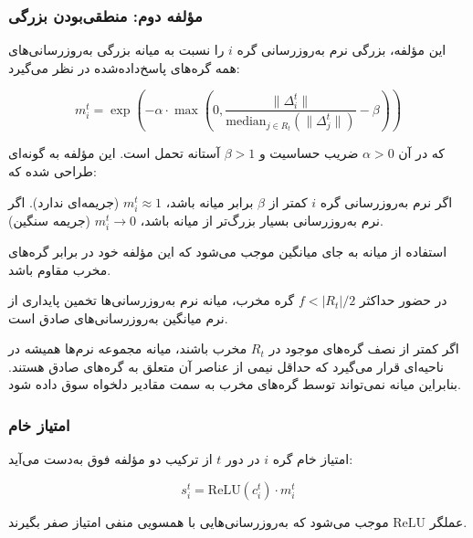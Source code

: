\subsubsection{مؤلفه دوم: منطقی‌بودن بزرگی}

این مؤلفه، بزرگی نرم به‌روزرسانی گره $i$ را نسبت به میانه بزرگی به‌روزرسانی‌های همه گره‌های پاسخ‌داده‌شده در نظر می‌گیرد:

\begin{equation}
    m_i^t = \exp\left(-\alpha \cdot \max\left(0, \frac{\|\Delta_i^t\|}{\text{median}_{j \in R_t}(\|\Delta_j^t\|)} - \beta\right)\right)
    \label{eq:magnitude}
\end{equation}

که در آن $\alpha > 0$ ضریب حساسیت و $\beta > 1$ آستانه تحمل است. این مؤلفه به گونه‌ای طراحی شده که:
\begin{itemize}
    \tick اگر نرم به‌روزرسانی گره $i$ کمتر از $\beta$ برابر میانه باشد، $m_i^t \approx 1$ (جریمه‌ای ندارد).
    \tick اگر نرم به‌روزرسانی بسیار بزرگ‌تر از میانه باشد، $m_i^t \to 0$ (جریمه سنگین).
\end{itemize}

استفاده از میانه به جای میانگین موجب می‌شود که این مؤلفه خود در برابر گره‌های مخرب مقاوم باشد.

\begin{lemma}
\label{lemma:magnitude}
    در حضور حداکثر $f < |R_t|/2$ گره مخرب، میانه نرم به‌روزرسانی‌ها تخمین پایداری از نرم میانگین به‌روزرسانی‌های صادق است.
\end{lemma}

\begin{lemmaproof}
    اگر کمتر از نصف گره‌های موجود در $R_t$ مخرب باشند، میانه مجموعه نرم‌ها همیشه در ناحیه‌ای قرار می‌گیرد که حداقل نیمی از عناصر آن متعلق به گره‌های صادق هستند. بنابراین میانه نمی‌تواند توسط گره‌های مخرب به سمت مقادیر دلخواه سوق داده شود.
\end{lemmaproof}

\subsubsection{امتیاز خام}

امتیاز خام گره $i$ در دور $t$ از ترکیب دو مؤلفه فوق به‌دست می‌آید:

\begin{equation}
    s_i^t = \text{ReLU}(c_i^t) \cdot m_i^t
    \label{eq:raw_score}
\end{equation}

عملگر $\text{ReLU}$ موجب می‌شود که به‌روزرسانی‌هایی با همسویی منفی امتیاز صفر بگیرند.


